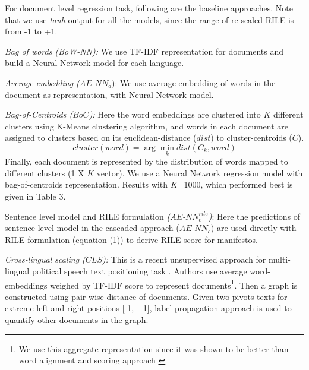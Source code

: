 \documentclass[11pt,a4paper]{article}
\newcommand{\argmin}{\arg\!\min}
\begin{document}
For document level regression task, following are the baseline approaches. Note that we use \textit{tanh} output for all the models, since the range of re-scaled RILE is from -1 to +1.

\begin{description}
\item{\textit{Bag of words (BoW-NN):}} We use TF-IDF representation for documents and build a Neural Network model  for each language.
\item{\textit{Average embedding ($AE$-$NN_{d}$}):} We use average embedding of words in the document as representation, with Neural Network model.

\item{\textit{Bag-of-Centroids ($BoC$):}} Here the word embeddings are clustered into $K$ different clusters using K-Means clustering algorithm, and  words in each document are assigned to clusters based on its euclidean-distance ($dist$) to cluster-centroids ($C$). 
\[ cluster (word) = \argmin_k dist(C_{k}, word) \]
Finally, each document is represented by the distribution of words mapped to different clusters (1 X $K$ vector). We use a Neural Network regression model with bag-of-centroids representation. Results with $K$=1000, which performed best is given in Table 3.

\item{Sentence level model and RILE formulation \textit{($AE$-$NN_{c}^{rile}$)}:} Here the predictions of sentence level model in the cascaded approach ($AE$-$NN_{c}$) are used directly with RILE formulation (equation (1)) to derive RILE score for manifestos.

\item{\textit{Cross-lingual scaling ($CLS$):}} This is a recent unsupervised approach for multi-lingual political speech text positioning task \cite{EACL}. Authors use average word-embeddings weighed by TF-IDF score to represent documents\footnote{We use this aggregate representation since it was shown to be better than word alignment and scoring approach \cite{EACL}}. Then a graph is constructed using pair-wise distance of documents. Given two pivots texts for extreme left and right positions [-1, +1], label propagation approach is used to quantify other documents in the graph.
\end{description}
\end{document}
